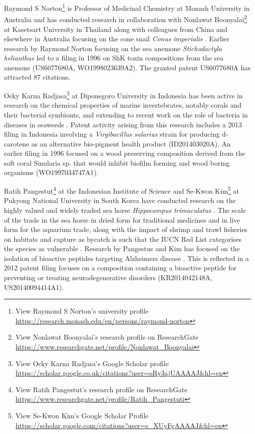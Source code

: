 \documentclass[openany]{book}
\let\rmarkdownfootnote\footnote%
\def\footnote{\protect\rmarkdownfootnote}
\theoremstyle{definition}
\theoremstyle{definition}
\theoremstyle{definition}
\theoremstyle{remark}
\begin{document}
Raymond S Norton\footnote{View Raymond S Norton's university profile
  \url{https://research.monash.edu/en/persons/raymond-norton}} is
Professor of Medicinal Chemistry at Monash University in Australia and
has conducted research in collaboration with Nonlawat
Boonyalai\footnote{View Nonlawat Boonyalai's research profile on
  ResearchGate
  \url{https://www.researchgate.net/profile/Nonlawat_Boonyalai}} at
Kasetsart University in Thailand along with colleagues from China and
elsewhere in Australia focusing on the cone snail \emph{Conus
imperialis} \citep{Ye_2012}. Earlier research by Raymond Norton focusing
on the sea anemone \emph{Stichodactyla helianthus} led to a filing in
1996 on ShK toxin compositions from the sea anemone (US6077680A,
WO1998023639A2). The granted patent US6077680A has attracted 87
citations.

Ocky Karna Radjasa\footnote{View Ocky Karna Radjasa's Google Scholar
  profile
  \url{https://scholar.google.co.uk/citations?user=oRy3ajUAAAAJ\&hl=en}}
at Diponegoro University in Indonesia has been active in research on the
chemical properties of marine invertebrates, notably corals and their
bacterial symbionts, and extending to recent work on the role of
bacteria in diseases in seaweeds
\citep{Ayuningrum_2017, Trianto_2017, Syafitri_2017}. Patent activity
arising from this research includes a 2013 filing in Indonesia involving
a \emph{Virgibacillus salarius} strain for producing d-carotene as an
alternative bio-pigment health product (ID201403020A). An earlier filing
in 1996 focused on a wood preserving composition derived from the soft
coral Sinularia sp. that would inhibit biofilm forming and wood boring
organisms (WO1997034747A1).

Ratih Pangestut\footnote{View Ratih Pangestut's research profile on
  ResearchGate
  \url{https://www.researchgate.net/profile/Ratih_Pangestuti}} at the
Indonesian Institute of Science and Se-Kwon Kim\footnote{View Se-Kwon
  Kim's Google Scholar Profile
  \url{https://scholar.google.com/citations?user=s_XUyFgAAAAJ\&hl=en}}
at Pukyong National University in South Korea have conducted research on
the highly valued and widely traded sea horse \emph{Hippocampus
trimaculatus} \citep{Pangestuti_2015}. The scale of the trade in the sea
horse in dried form for traditional medicines and in live form for the
aquarium trade, along with the impact of shrimp and trawl fisheries on
habitats and capture as bycatch is such that the IUCN Red List
categorises the species as vulnerable \citep{Hippocampus_2012}. Research
by Pangestus and Kim has focused on the isolation of bioactive peptides
targeting Alzheimers disease \citep{Pangestuti_2015}. This is reflected
in a 2012 patent filing focuses on a composition containing a bioactive
peptide for preventing or treating neurodegenerative disorders
(KR2014042148A, US20140094414A1).
\end{document}

